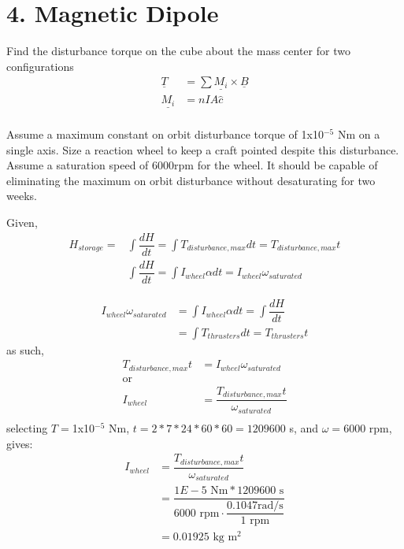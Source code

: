 \documentclass[onecolumn,10pt]{jhwhw}
\begin{document}
\part{4. Magnetic Dipole}
Find the disturbance torque on the cube about the mass center for two configurations
\begin{align*}
\underline{T} &= \sum \underline{M_i} \times \underline{B} \\
\underline{M_i} &= nIA\hat{c} \\
\end{align*}

Assume a maximum constant on orbit disturbance torque of 1x10$^{-5}$ Nm on a single axis. Size a reaction wheel to keep a craft pointed despite this disturbance. Assume a saturation speed of 6000rpm for the wheel. It should be capable of eliminating the maximum on orbit disturbance without desaturating for two weeks.

Given,
\begin{align*}
H_{{storage}} =& \int \dfrac{dH}{dt} = \int T_{{disturbance,max}} dt = T_{{disturbance,max}}t \\
& \int \dfrac{dH}{dt} = \int I_{{wheel}} \alpha dt = I_{{wheel}} \omega_{{saturated}}
\end{align*}

\begin{align*}
I_{{wheel}} \omega_{{saturated}} & = \int I_{{wheel}} \alpha dt = \int \dfrac{dH}{dt} \\
                                 & = \int T_{{thrusters}} dt = T_{{thrusters}} t
\end{align*}
as such,
\begin{align*}
T_{{disturbance,max}}t &= I_{{wheel}} \omega_{{saturated}} \\
\mbox{or} \\
I_{{wheel}} &= \dfrac{T_{{disturbance,max}}t}{\omega_{{saturated}} }\\
\end{align*}
selecting $T =$1x10$^{-5}$ Nm, $t=2*7*24*60*60=1209600$ s, and $\omega=6000$ rpm, gives:
\begin{align*}
I_{{wheel}} &= \dfrac{T_{{disturbance,max}}t}{\omega_{{saturated}} }\\
            &= \dfrac{1E-5 \mbox{ Nm} * 1209600 \mbox{ s}}{6000\mbox{ rpm} \cdot \dfrac{0.1047\mbox{rad/s}}{1\mbox{ rpm}}} \\
            &= 0.01925 \mbox{ kg m$^2$}
\end{align*}
\end{document}
